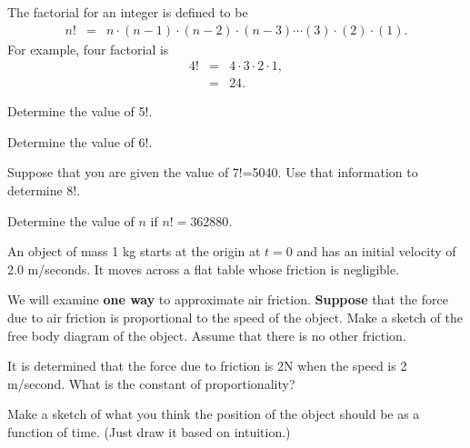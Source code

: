 \begin{problem}
\item The factorial for an integer is defined to be
  \begin{eqnarray*}
    n! & = & n \cdot (n-1) \cdot (n-2) \cdot (n-3) \cdots (3) \cdot (2) \cdot (1).
  \end{eqnarray*}
  For example, four factorial is
  \begin{eqnarray*}
    4! & = & 4 \cdot 3 \cdot 2 \cdot 1, \\
       & = & 24.
  \end{eqnarray*}

  \begin{subproblem}
  \item Determine the value of 5!.
    \vfill
  \item Determine the value of 6!.
    \vfill
  \item Suppose that you are given the value of 7!=5040. Use that
    information to determine 8!.
    \vfill
  \item Determine the value of $n$ if $n!=362880$.
    \vfill
  \end{subproblem}

\clearpage

\item An object of mass 1 kg starts at the origin at $t=0$ and has an
  initial velocity of 2.0 m/seconds. It moves across a flat table
  whose friction is negligible.
  \begin{subproblem}
  \item We will examine \textbf{one way} to approximate air friction.
    \textbf{Suppose} that the force due to air friction is
    proportional to the speed of the object.  Make a sketch of the
    free body diagram of the object. Assume that there is no other
    friction.  

    \vfill

  \item It is determined that the force due to friction is 2N when the
    speed is 2 m/second. What is the constant of proportionality?

    \vspace{4em}

  \item Make a sketch of what you think the position of the object
    should be as a function of time. (Just draw it based on
    intuition.)

    \vfill
  \end{subproblem}

\end{problem}


